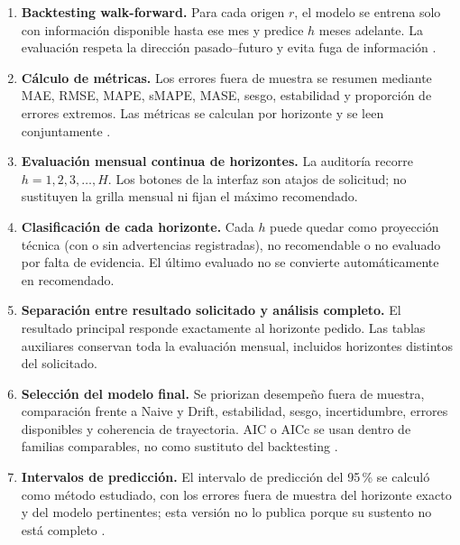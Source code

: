 ﻿\documentclass[12pt,letterpaper]{article}
\begin{document}
\begin{enumerate}[leftmargin=*,label=\textbf{Paso \arabic*.}]
    \item \textbf{Backtesting walk-forward.} Para cada origen \(r\), el modelo se entrena solo con información disponible hasta ese mes y predice \(h\) meses adelante. La evaluación respeta la dirección pasado--futuro y evita fuga de información \citep{tashman2000,hyndman_tscv_2021,skforecast_backtesting_2026}.

    \item \textbf{Cálculo de métricas.} Los errores fuera de muestra se resumen mediante MAE, RMSE, MAPE, sMAPE, MASE, sesgo, estabilidad y proporción de errores extremos. Las métricas se calculan por horizonte y se leen conjuntamente \citep{hyndman_koehler2006}.

    \item \textbf{Evaluación mensual continua de horizontes.} La auditoría recorre \(h=1,2,3,\ldots,H\). Los botones de la interfaz son atajos de solicitud; no sustituyen la grilla mensual ni fijan el máximo recomendado.

    \item \textbf{Clasificación de cada horizonte.} Cada \(h\) puede quedar como proyección técnica (con o sin advertencias registradas), no recomendable o no evaluado por falta de evidencia. El último evaluado no se convierte automáticamente en recomendado.

    \item \textbf{Separación entre resultado solicitado y análisis completo.} El resultado principal responde exactamente al horizonte pedido. Las tablas auxiliares conservan toda la evaluación mensual, incluidos horizontes distintos del solicitado.

    \item \textbf{Selección del modelo final.} Se priorizan desempeño fuera de muestra, comparación frente a Naive y Drift, estabilidad, sesgo, incertidumbre, errores disponibles y coherencia de trayectoria. AIC o AICc se usan dentro de familias comparables, no como sustituto del backtesting \citep{hyndman_khandakar2008,hyndman2021fpp3}.

    \item \textbf{Intervalos de predicción.} El intervalo de predicción del 95\,\% se calculó como método estudiado, con los errores fuera de muestra del horizonte exacto y del modelo pertinentes; esta versión no lo publica porque su sustento no está completo \citep{hyndman2021fpp3}.


\end{enumerate}
\end{document}
